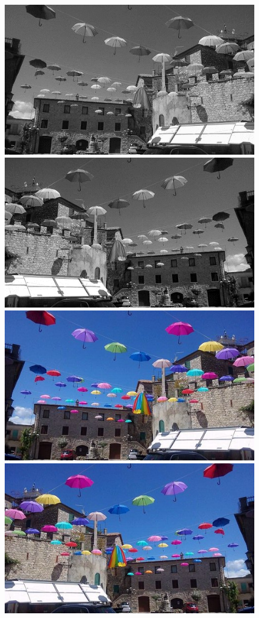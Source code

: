 \documentclass{article}
\begin{document}
	\begin{figure}[!ht]	
	\centering	
	\includegraphics{img/gray-obraz1}	
	\includegraphics{img/geometryczne/symetriaY-gray}
	\includegraphics{img/rgb-obraz1}	
	\includegraphics{img/geometryczne/symetriaY-rgb}

\end{figure}
\end{document}

